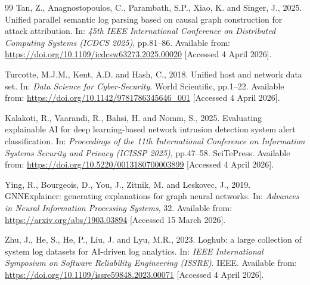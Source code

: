 \documentclass[12pt,a4paper]{report}
\begin{document}
\begin{thebibliography}{99}
Tan, Z., Anagnostopoulos, C., Parambath, S.P., Xiao, K. and Singer, J., 2025. Unified parallel semantic log parsing based on causal graph construction for attack attribution. In: \textit{45th IEEE International Conference on Distributed Computing Systems (ICDCS 2025)}, pp.81--86. Available from: \url{https://doi.org/10.1109/icdcsw63273.2025.00020} [Accessed 4 April 2026].

Turcotte, M.J.M., Kent, A.D. and Hash, C., 2018. Unified host and network data set. In: \textit{Data Science for Cyber-Security}. World Scientific, pp.1--22. Available from: \url{https://doi.org/10.1142/9781786345646_001} [Accessed 4 April 2026].

Kalakoti, R., Vaarandi, R., Bahsi, H. and Nomm, S., 2025. Evaluating explainable AI for deep learning-based network intrusion detection system alert classification. In: \textit{Proceedings of the 11th International Conference on Information Systems Security and Privacy (ICISSP 2025)}, pp.47--58. SciTePress. Available from: \url{https://doi.org/10.5220/0013180700003899} [Accessed 4 April 2026].

Ying, R., Bourgeois, D., You, J., Zitnik, M. and Leskovec, J., 2019. GNNExplainer: generating explanations for graph neural networks. In: \textit{Advances in Neural Information Processing Systems}, 32. Available from: \url{https://arxiv.org/abs/1903.03894} [Accessed 15 March 2026].

Zhu, J., He, S., He, P., Liu, J. and Lyu, M.R., 2023. Loghub: a large collection of system log datasets for AI-driven log analytics. In: \textit{IEEE International Symposium on Software Reliability Engineering (ISSRE)}. IEEE. Available from: \url{https://doi.org/10.1109/issre59848.2023.00071} [Accessed 4 April 2026].

\end{thebibliography}
\end{document}
